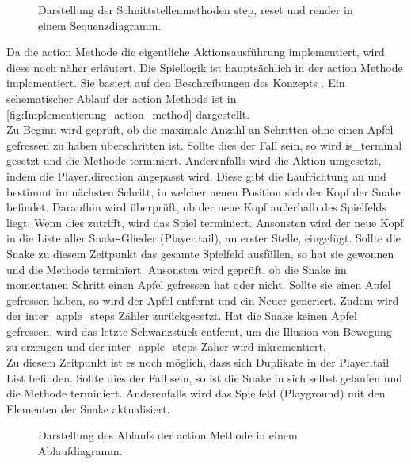 \begin{figure}[H]
	\centering
	
	\caption[Sequenzdiagramm]{Darstellung der Schnittstellenmethoden step, reset und render in einem Sequenzdiagramm.}
	\label{fig:Implementierung_Sequenzdiagram}
\end{figure}
Da die action Methode die eigentliche Aktionsausführung  implementiert, wird diese noch näher erläutert.
Die Spiellogik ist hauptsächlich in der action Methode implementiert. Sie basiert auf den Beschreibungen des Konzepts . Ein schematischer Ablauf der action Methode ist in \autoref{fig:Implementierung_action_method} dargestellt.\\
Zu Beginn wird geprüft, ob die maximale Anzahl an Schritten ohne einen Apfel gefressen zu haben überschritten ist. Sollte dies der Fall sein, so wird is\_terminal gesetzt und die Methode terminiert. Anderenfalls wird die Aktion umgesetzt, indem die Player.direction angepasst wird. Diese gibt die Laufrichtung an und bestimmt im nächsten Schritt, in welcher neuen Position sich der Kopf der Snake befindet. Daraufhin wird überprüft, ob der neue Kopf außerhalb des Spielfelds liegt. Wenn dies zutrifft, wird das Spiel terminiert.
Ansonsten wird der neue Kopf in die Liste aller Snake-Glieder (Player.tail), an erster Stelle, eingefügt. Sollte die Snake zu diesem Zeitpunkt das gesamte Spielfeld ausfüllen, so hat sie gewonnen und die Methode terminiert. Ansonsten wird geprüft, ob die Snake im momentanen Schritt einen Apfel gefressen hat oder nicht. Sollte sie einen Apfel gefressen haben, so wird der Apfel entfernt und ein Neuer generiert. Zudem wird der inter\_apple\_steps Zähler zurückgesetzt. Hat die Snake keinen Apfel gefressen, wird das letzte Schwanzstück entfernt, um die Illusion von Bewegung zu erzeugen und der inter\_apple\_steps Zäher wird inkrementiert.\\
Zu diesem Zeitpunkt ist es noch möglich, dass sich Duplikate in der Player.tail List befinden. Sollte dies der Fall sein, so ist die Snake in sich selbst gelaufen und die Methode terminiert. Anderenfalls wird das Spielfeld (Playground) mit den Elementen der Snake aktualisiert.
\begin{figure}[H]
	\centering
	
	\caption[Ablaufdiagramm der action Methode]{Darstellung des Ablaufs der action Methode in einem Ablaufdiagramm.}
	\label{fig:Implementierung_action_method}
\end{figure}

